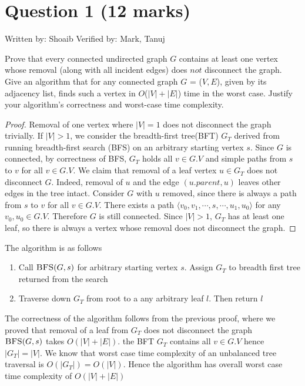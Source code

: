 \documentclass[11pt]{article}
\begin{document}
\section*{Question 1 (12 marks)}
Written by: Shoaib\newline
Verified by: Mark, Tanuj\newline

\noindent Prove that every connected undirected graph $G$ contains at least one vertex
whose removal (along with all incident edges) does $not$ disconnect the graph. Give an algorithm that for
any connected graph $G$ = ($V, E$), given by its adjacency list, finds such a vertex in $O$($|V| + |E|$) time in
the worst case. Justify your algorithm’s correctness and worst-case time complexity.



\begin{proof}
  Removal of one vertex where $|V| = 1$ does not disconnect the graph trivially. If $|V| > 1$, we consider the breadth-first tree(BFT) $G_T$ derived from running breadth-first search (BFS) on an arbitrary starting vertex $s$. Since $G$ is connected, by correctness of BFS, $G_T$ holds all $v\in G.V$ and simple paths from $s$ to $v$ for all $v\in G.V$. We claim that removal of a leaf vertex $u\in G_T$ does not disconnect $G$. Indeed, removal of $u$ and the edge $(u.parent, u)$ leaves other edges in the tree intact. Consider $G$ with $u$ removed, since there is always a path from $s$ to $v$ for all $v\in G.V$. There exists a path $\langle v_0, v_1, \cdots, s, \cdots, u_1, u_0 \rangle$ for any $v_0, u_0 \in G.V$. Therefore $G$ is still connected. Since $|V|>1$, $G_T$ has at least one leaf, so there is always a vertex whose removal does not disconnect the graph.
\end{proof}

The algorithm is as follows
\begin{enumerate}
  \item Call $\textsc{BFS}(G, s)$ for arbitrary starting vertex $s$. Assign $G_T$ to breadth first tree returned from the search
  \item Traverse down $G_T$ from root to a any arbitrary leaf $l$. Then return $l$
\end{enumerate}
$ $\\
The correctness of the algorithm follows from the previous proof, where we proved that removal of a leaf from $G_T$ does not disconnect the graph\\
$\textsc{BFS}(G,s)$ takes $O(|V| + |E|)$. the BFT $G_T$ contains all $v\in G.V$ hence $|G_T| = |V|$. We know that worst case time complexity of an unbalanced tree traversal is $O(|G_T|) = O(|V|)$. Hence the algorithm has overall worst case time complexity of $O(|V| + |E|)$
\end{document}

